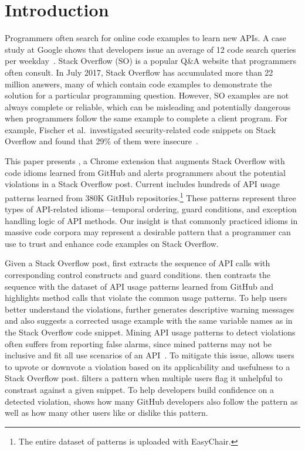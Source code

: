 \section{Introduction}
\label{sec:intro}
Programmers often search for online code examples to learn new APIs. A case study at Google shows that developers issue an average of 12 code search queries per weekday~\cite{sadowski2015developers}. Stack Overflow (SO) is a popular Q\&A website that programmers often consult. In July 2017, Stack Overflow has accumulated more than 22 million answers, many of which contain code examples to demonstrate the solution for a particular programming question. However, SO examples are not always complete or reliable, which can be misleading and potentially dangerous when programmers follow the same example to complete a client program. For example, Fischer et al.~investigated security-related code snippets on Stack Overflow and found that 29\% of them were insecure~\cite{fischer2017stack}. 

This paper presents {\tool}, a Chrome extension that augments Stack Overflow with code idioms learned from GitHub and alerts programmers about the potential violations in a Stack Overflow post. Current {\tool} includes hundreds of API usage patterns learned from 380K GitHub repositories.\footnote{The entire dataset of patterns is uploaded with EasyChair.} These patterns represent three types of API-related idioms---temporal ordering, guard conditions, and exception handling logic of API methods. Our insight is that commonly practiced idioms in massive code corpora may represent a desirable pattern that a programmer can use to trust and enhance code examples on Stack Overflow. 

Given a Stack Overflow post, {\tool} first extracts the sequence of API calls with corresponding control constructs and guard conditions. {\tool} then contrasts the sequence with the dataset of API usage patterns learned from GitHub and highlights method calls that violate the common usage patterns. To help users better understand the violations, {\tool} further generates descriptive warning messages and also suggests a corrected usage example with the same variable names as in the Stack Overflow code snippet. Mining API usage patterns to detect violations often suffers from reporting false alarms, since mined patterns may not be inclusive and fit all use scenarios of an API~\cite{liang2016antminer}. To mitigate this issue, {\tool} allows users to upvote or downvote a violation based on its applicability and usefulness to a Stack Overflow post. {\tool} filters a pattern when multiple users flag it unhelpful to constrast against a given snippet. To help developers build confidence on a detected violation, {\tool} shows how many GitHub developers also follow the pattern as well as how many other users like or dislike this pattern.

